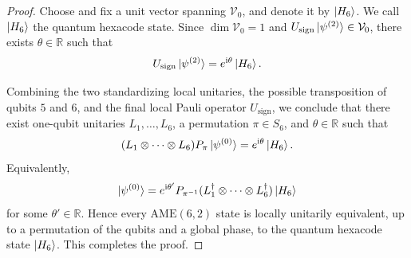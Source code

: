\begin{proof}
Choose and fix a unit vector spanning $\mathcal{V}_0$, and denote it by
$\ket{H_6}$. We call $\ket{H_6}$ the quantum hexacode state. Since
$\dim \mathcal{V}_0=1$ and
$U_{\mathrm{sign}}\ket{\psi^{(2)}}\in\mathcal{V}_0$, there exists
$\theta\in\mathbb{R}$ such that
\begin{equation}
    U_{\mathrm{sign}}\ket{\psi^{(2)}}
    =e^{\mathrm{i}\theta}\ket{H_6}.
\end{equation}

Combining the two standardizing local unitaries, the possible
transposition of qubits $5$ and $6$, and the final local Pauli operator
$U_{\mathrm{sign}}$, we conclude that there exist one-qubit unitaries
$L_1,\ldots,L_6$, a permutation $\pi\in S_6$, and
$\theta\in\mathbb{R}$ such that
\begin{equation}
    (L_1\otimes\cdots\otimes L_6)
    P_\pi\ket{\psi^{(0)}}
    =
    e^{\mathrm{i}\theta}\ket{H_6}.
\end{equation}
Equivalently,
\begin{equation}
    \ket{\psi^{(0)}}
    =
    e^{\mathrm{i}\theta'}
    P_{\pi^{-1}}
    (L_1^\dagger\otimes\cdots\otimes L_6^\dagger)
    \ket{H_6}
\end{equation}
for some $\theta'\in\mathbb{R}$. Hence every $\mathrm{AME}(6,2)$ state
is locally unitarily equivalent, up to a permutation of the qubits and
a global phase, to the quantum hexacode state $\ket{H_6}$. 
This completes the proof.
    
\end{proof}



